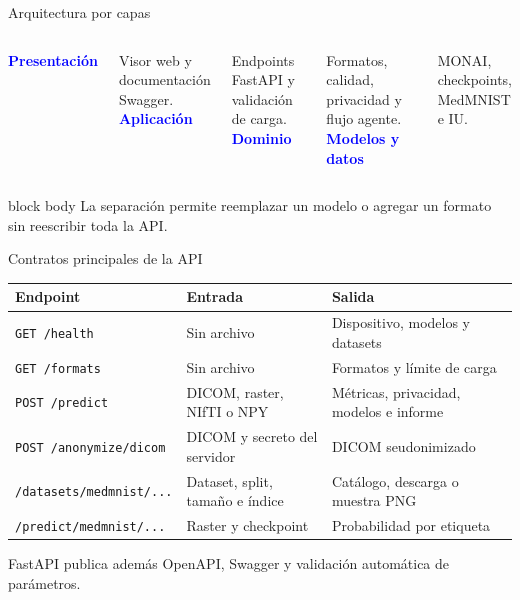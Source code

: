 \documentclass[aspectratio=169,10pt]{beamer}
\newcommand{\bigpoint}[2]{\textcolor{Blue}{\Large\bfseries #1}\par\smallskip #2}
\begin{document}
\begin{frame}{Arquitectura por capas}
\begin{columns}[T,onlytextwidth]
\bigpoint{Presentación}{Visor web y documentación Swagger.}
\bigpoint{Aplicación}{Endpoints FastAPI y validación de carga.}
\bigpoint{Dominio}{Formatos, calidad, privacidad y flujo agente.}
\bigpoint{Modelos y datos}{MONAI, checkpoints, MedMNIST e IU.}
\end{columns}
\vspace{0.85cm}
\begin{beamercolorbox}[rounded=true,sep=0.4cm]{block body}
La separación permite reemplazar un modelo o agregar un formato sin reescribir toda la API.
\end{beamercolorbox}
\end{frame}

\begin{frame}{Contratos principales de la API}
\centering
\begin{tabular}{@{}p{2.7cm}p{3.7cm}p{5.0cm}@{}}
\toprule
\textbf{Endpoint} & \textbf{Entrada} & \textbf{Salida} \\
\midrule
\texttt{GET /health} & Sin archivo & Dispositivo, modelos y datasets \\
\texttt{GET /formats} & Sin archivo & Formatos y límite de carga \\
\texttt{POST /predict} & DICOM, raster, NIfTI o NPY & Métricas, privacidad, modelos e informe \\
\texttt{POST /anonymize/dicom} & DICOM y secreto del servidor & DICOM seudonimizado \\
\texttt{/datasets/medmnist/...} & Dataset, split, tamaño e índice & Catálogo, descarga o muestra PNG \\
\texttt{/predict/medmnist/...} & Raster y checkpoint & Probabilidad por etiqueta \\
\bottomrule
\end{tabular}
\vspace{0.55cm}
{\color{Muted}\small FastAPI publica además OpenAPI, Swagger y validación automática de parámetros.}
\end{frame}
\end{document}

